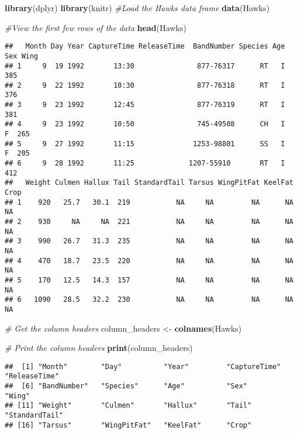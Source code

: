 \documentclass[
]{article}
\newenvironment{Shaded}{\begin{snugshade}}{\end{snugshade}}
\newcommand{\CommentTok}[1]{\textcolor[rgb]{0.56,0.35,0.01}{\textit{#1}}}
\newcommand{\FunctionTok}[1]{\textcolor[rgb]{0.13,0.29,0.53}{\textbf{#1}}}
\newcommand{\NormalTok}[1]{#1}
\newcommand{\OtherTok}[1]{\textcolor[rgb]{0.56,0.35,0.01}{#1}}
\begin{document}
\begin{Shaded}
\begin{Highlighting}[]
\FunctionTok{library}\NormalTok{(dplyr)}
\FunctionTok{library}\NormalTok{(knitr)}
\CommentTok{\#Load the Hawks data frame}
\FunctionTok{data}\NormalTok{(Hawks)}

\CommentTok{\#View the first few rows of the data}
\FunctionTok{head}\NormalTok{(Hawks)}
\end{Highlighting}
\end{Shaded}

\begin{verbatim}
##   Month Day Year CaptureTime ReleaseTime  BandNumber Species Age Sex Wing
## 1     9  19 1992       13:30               877-76317      RT   I      385
## 2     9  22 1992       10:30               877-76318      RT   I      376
## 3     9  23 1992       12:45               877-76319      RT   I      381
## 4     9  23 1992       10:50               745-49508      CH   I   F  265
## 5     9  27 1992       11:15              1253-98801      SS   I   F  205
## 6     9  28 1992       11:25             1207-55910       RT   I      412
##   Weight Culmen Hallux Tail StandardTail Tarsus WingPitFat KeelFat Crop
## 1    920   25.7   30.1  219           NA     NA         NA      NA   NA
## 2    930     NA     NA  221           NA     NA         NA      NA   NA
## 3    990   26.7   31.3  235           NA     NA         NA      NA   NA
## 4    470   18.7   23.5  220           NA     NA         NA      NA   NA
## 5    170   12.5   14.3  157           NA     NA         NA      NA   NA
## 6   1090   28.5   32.2  230           NA     NA         NA      NA   NA
\end{verbatim}

\begin{Shaded}
\begin{Highlighting}[]
\CommentTok{\# Get the column headers}
\NormalTok{column\_headers }\OtherTok{\textless{}{-}} \FunctionTok{colnames}\NormalTok{(Hawks)}

\CommentTok{\# Print the column headers}
\FunctionTok{print}\NormalTok{(column\_headers)}
\end{Highlighting}
\end{Shaded}

\begin{verbatim}
##  [1] "Month"        "Day"          "Year"         "CaptureTime"  "ReleaseTime" 
##  [6] "BandNumber"   "Species"      "Age"          "Sex"          "Wing"        
## [11] "Weight"       "Culmen"       "Hallux"       "Tail"         "StandardTail"
## [16] "Tarsus"       "WingPitFat"   "KeelFat"      "Crop"
\end{verbatim}
\end{document}

